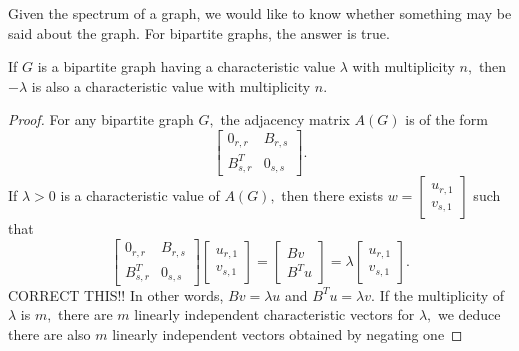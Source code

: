 Given the spectrum of a graph, we would like to know whether something
may be said about the graph. For bipartite graphs, the answer is true.

\begin{theorem}
	If $G$ is a bipartite graph having a characteristic value 
	$\lambda$ with multiplicity $n,$ then $-\lambda$ is also
	a characteristic value with multiplicity $n.$
\end{theorem}
\begin{proof}
	For any bipartite graph $G,$ the adjacency matrix $A(G)$
	is of the form
	$$\begin{bmatrix}
		0_{r,r} & B_{r,s} \\ B^T_{s,r} & 0_{s,s} 
	\end{bmatrix}.$$
	If $\lambda > 0$ is a characteristic value of $A(G),$ then there
	exists $w = \begin{bmatrix} u _{r,1} \\ v_{s,1} \end{bmatrix}$
	such that
	$$\begin{bmatrix}
		0_{r,r} & B_{r,s} \\ B^T_{s,r} & 0_{s,s} 
	\end{bmatrix}
	\begin{bmatrix} u_{r,1} \\ v_{s,1} \end{bmatrix}
	=\begin{bmatrix}
		B v \\ B^T u
	\end{bmatrix}
	 =  \lambda \begin{bmatrix} u _{r,1} \\ v_{s,1} \end{bmatrix}.$$
	 CORRECT THIS!!
	 In other words, $B v = \lambda u$ and $B^T u = \lambda v.$
	 If the multiplicity of $\lambda$ is $m,$ there are 
	 $m$ linearly independent characteristic vectors for $\lambda,$
	 we deduce there are also $m$ linearly independent vectors 
	 obtained by negating one 
\end{proof}
